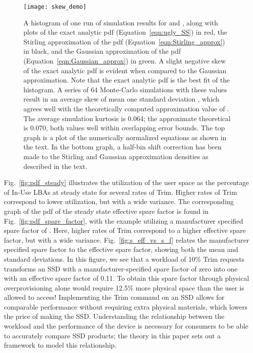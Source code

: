 \documentclass[prodmode,acmtos]{acmsmall}
\begin{document}
\begin{figure}
\centerline{\texttt{[image: skew\_demo]}}
\caption{A histogram of one run of simulation results for  and , along with plots of the exact analytic pdf (Equation~\ref{eqn:ugly_SS}) in red, the Stirling approximation of the pdf (Equation~\ref{eqn:Stirling_approx}) in black, and the Gaussian approximation of the pdf (Equation~\ref{eqn:Gaussian_approx}) in green.  A slight negative skew of the exact analytic pdf is evident when compared to the Gaussian approximation.  Note that the exact analytic pdf is the best fit of the histogram.  A series of 64 Monte-Carlo simulations with these values result in an average skew of mean  one standard deviation , which agrees well with the theoretically computed approximation value of .  The average simulation kurtosis is 0.064; the approximate theoretical is 0.070, both values well within overlapping error bounds.  The top graph is a plot of the numerically normalized equations as shown in the text.  In the bottom graph, a half-bin shift correction has been made to the Stirling and Gaussian approximation densities as described in the text.}
\label{fig:skew_demo}
\end{figure}

Fig.~\ref{fig:pdf_steady} illustrates the utilization of the user space as the percentage of In-Use LBAs at steady state for several rates of Trim.  Higher rates of Trim correspond to lower utilization, but with a wide variance.  The corresponding graph of the pdf of the steady state effective spare factor is found in Fig.~\ref{fig:pdf_spare_factor}, with the example utilizing a manufacturer specified spare factor of .  Here, higher rates of Trim correspond to a higher effective spare factor, but with a wide variance.  Fig.~\ref{fig:s_eff_vs_s_f} relates the manufacturer specified spare factor to the effective spare factor, showing both the mean and  standard deviations.  In this figure, we see that a workload of 10\% Trim requests transforms an SSD with a manufacturer-specified spare factor of zero into one with an effective spare factor of 0.11.  To obtain this spare factor through physical overprovisioning alone would require 12.5\% more physical space than the user is allowed to access! Implementing the Trim command on an SSD allows for comparable performance without requiring extra physical materials, which lowers the price of making the SSD.  Understanding the relationship between the workload and the performance of the device is necessary for consumers to be able to accurately compare SSD products; the theory in this paper sets out a framework to model this relationship.
\end{document}
